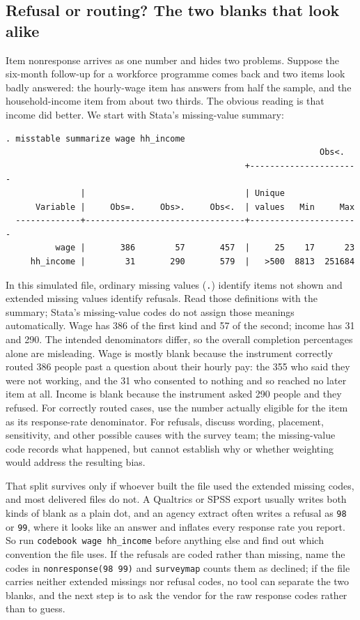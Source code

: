 \documentclass[
    a4paper,
    fontsize=10pt,
    twoside=true,
    numbers=noenddot,
]{kaobook}
\begin{document}
\subsection{Refusal or routing? The two blanks that look alike}\label{sec:ch05-surveymap}
Item nonresponse arrives as one number and hides two problems. Suppose the six-month follow-up for a workforce programme comes back and two items look badly answered: the hourly-wage item has answers from half the sample, and the household-income item from about two thirds. The obvious reading is that income did better. We start with Stata's missing-value summary:
\par
{\footnotesize
\begin{verbatim}
. misstable summarize wage hh_income
                                                               Obs<.
                                                +----------------------
               |                                | Unique
      Variable |     Obs=.     Obs>.     Obs<.  | values   Min     Max
  -------------+--------------------------------+----------------------
          wage |       386        57       457  |     25    17      23
     hh_income |        31       290       579  |   >500  8813  251684
\end{verbatim}
}
In this simulated file, ordinary missing values (\texttt{.}) identify items not shown and extended missing values identify refusals. Read those definitions with the summary; Stata's missing-value codes do not assign those meanings automatically. Wage has 386 of the first kind and 57 of the second; income has 31 and 290. The intended denominators differ, so the overall completion percentages alone are misleading. Wage is mostly blank because the instrument correctly routed 386 people past a question about their hourly pay: the 355 who said they were not working, and the 31 who consented to nothing and so reached no later item at all. Income is blank because the instrument asked 290 people and they refused. For correctly routed cases, use the number actually eligible for the item as its response-rate denominator. For refusals, discuss wording, placement, sensitivity, and other possible causes with the survey team; the missing-value code records what happened, but cannot establish why or whether weighting would address the resulting bias.

That split survives only if whoever built the file used the extended missing codes, and most delivered files do not. A Qualtrics or SPSS export usually writes both kinds of blank as a plain dot, and an agency extract often writes a refusal as \texttt{98} or \texttt{99}, where it looks like an answer and inflates every response rate you report. So run \texttt{codebook wage hh\_income} before anything else and find out which convention the file uses. If the refusals are coded rather than missing, name the codes in \texttt{nonresponse(98 99)} and \texttt{surveymap} counts them as declined; if the file carries neither extended missings nor refusal codes, no tool can separate the two blanks, and the next step is to ask the vendor for the raw response codes rather than to guess.
\end{document}
